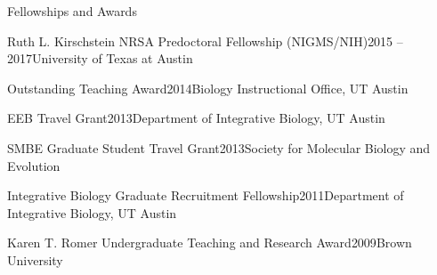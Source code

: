\documentclass{resume} %
\begin{document}
\vspace*{0.5cm}
\begin{rSection}{Fellowships and Awards}
\vspace*{0.25cm}

\begin{rSubsection}{Ruth L. Kirschstein NRSA Predoctoral Fellowship (NIGMS/NIH)}{2015 -- 2017}{University of Texas at Austin}
\end{rSubsection}


\begin{rSubsection}{Outstanding Teaching Award}{2014}{Biology Instructional Office, UT Austin}{}
\end{rSubsection}

\begin{rSubsection}{EEB Travel Grant}{2013}{Department of Integrative Biology, UT Austin}{}
\end{rSubsection}

\begin{rSubsection}{SMBE Graduate Student Travel Grant}{2013}{Society for Molecular Biology and Evolution}{}
\end{rSubsection}

\begin{rSubsection}{Integrative Biology Graduate Recruitment Fellowship}{2011}{Department of Integrative Biology, UT Austin}{}
\end{rSubsection}

\begin{rSubsection}{Karen T. Romer Undergraduate Teaching and Research Award}{2009}{Brown University}{}
\end{rSubsection}


\end{rSection}
\end{document}
